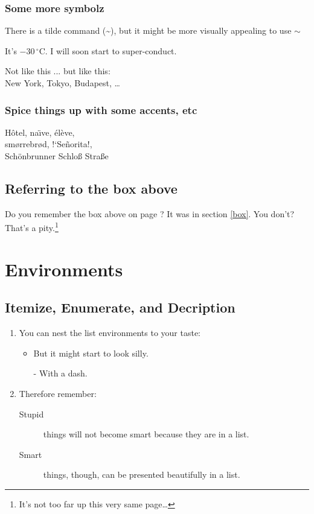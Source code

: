 \documentclass[11pt]{article}
\begin{document}
\subsubsection{Some more symbolz}
There is a tilde command (\~{}), but it might be more visually appealing to use $\sim$

It's $-30\,^{\circ}\mathrm{C}$.
I will soon start to
super-conduct.

Not like this ... but like this:\\
New York, Tokyo, Budapest, \ldots

\subsubsection{Spice things up with some accents, etc}

H\^otel, na\"\i ve, \'el\`eve,\\
sm\o rrebr\o d, !`Se\~norita!,\\
Sch\"onbrunner Schlo\ss{}
Stra\ss e

\subsection{Referring to the box above}
Do you remember the box above on page \pageref{box}? It was in section \ref{box}. You don't? That's a pity.\footnote{It's not too far up this very same page\ldots}

\section{Environments}
\subsection{Itemize, Enumerate, and Decription}

\flushleft
\begin{enumerate}
\item You can nest the list
environments to your taste:
\begin{itemize}
\item But it might start to
look silly.
\item[-] With a dash.
\end{itemize}
\item Therefore remember:
\begin{description}
\item[Stupid] things will not
become smart because they are
in a list.
\item[Smart] things, though,
can be presented beautifully
in a list.
\end{description}
\end{enumerate}
\end{document}
